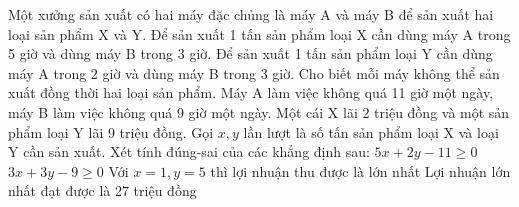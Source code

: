 \begin{ex}
 Một xưởng sản xuất có hai máy đặc chủng là máy A và máy B để sản xuất hai loại sản phẩm X và Y. Để sản xuất 1 tấn sản phẩm loại X cần dùng máy A trong 5 giờ và dùng máy B trong 3 giờ. Để sản xuất 1 tấn sản phẩm loại Y cần dùng máy A trong 2 giờ và dùng máy B trong 3 giờ. Cho biết mỗi máy không thể sản xuất đồng thời hai loại sản phẩm. Máy A làm việc không quá 11 giờ một ngày, máy B làm việc không quá 9 giờ một ngày. Một cái X lãi 2 triệu đồng và một sản phẩm loại Y lãi 9 triệu đồng. Gọi ${x,y}$ lần lượt là số tấn sản phẩm loại X và loại Y cần sản xuất. Xét tính đúng-sai của các khẳng định sau:
\choiceTFt
{ $5 x + 2 y - 11 \ge 0$ }
   { $3 x + 3 y - 9 \ge 0$ }
     { Với $x = 1, y = 5$ thì lợi nhuận thu được là lớn nhất }
    { \True  Lợi nhuận lớn nhất đạt được là 27 triệu đồng }
\end{ex}

